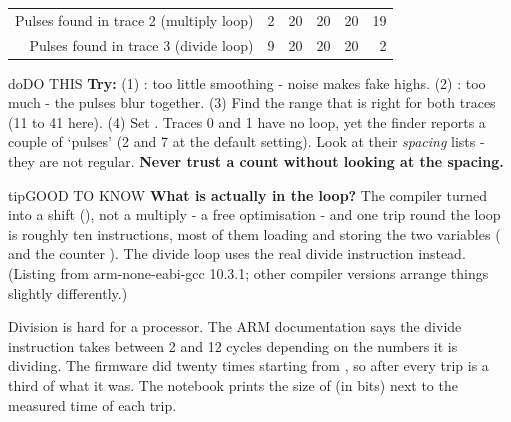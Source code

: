 \documentclass[11pt,letterpaper]{article}
\begin{document}

{\small{}
\begin{longtable}{|R{0.4058}|R{0.1159}|R{0.1159}|R{0.1159}|R{0.1159}|R{0.1304}|}
\hline
{} &  &  &  &  &  \\ \hline
\endhead
Pulses found in trace 2 (multiply loop) & 2 & 20 & 20 & 20 & 19 \\ \hline
Pulses found in trace 3 (divide loop) & 9 & 20 & 20 & 20 & 2 \\ \hline
\end{longtable}}

\vspace{4pt}

\begin{guidecallout}{do}{DO THIS}
\textbf{Try:} (1) : too little smoothing - noise makes fake highs. (2) : too much -
the pulses blur together. (3) Find the range that is right for both traces (11 to 41 here). (4) Set
. Traces 0 and 1 have no loop, yet the finder reports a couple of `pulses' (2
and 7 at the default setting). Look at their \emph{spacing} lists - they are not regular. \textbf{Never trust a count
without looking at the spacing.}
\end{guidecallout}

\begin{guidecallout}{tip}{GOOD TO KNOW}
\textbf{What is actually in the loop?} The compiler turned  into a shift (), not a multiply -
a free optimisation - and one trip round the loop is roughly ten instructions, most of them loading and storing the
two  variables ( and the counter ). The divide loop uses the real  divide
instruction instead. (Listing from arm-none-eabi-gcc 10.3.1; other compiler versions arrange things slightly
differently.)
\end{guidecallout}

\Needspace{324pt}


Division is hard for a processor. The ARM documentation says the divide instruction takes between 2 and 12 cycles
depending on the numbers it is dividing. The firmware did  twenty times starting from , so after every trip  is a third of what it was. The notebook prints the size of  (in
bits) next to the measured time of each trip.
\end{document}
